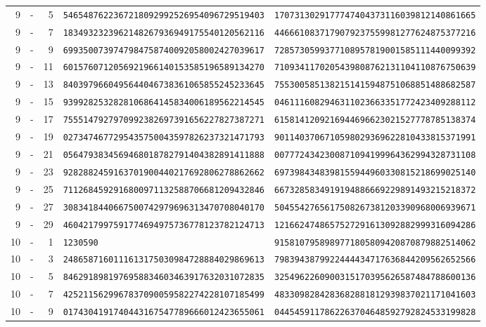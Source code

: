 \begin{longtable}{@{}rcrll@{}}
9&-&5&\texttt{5465487622367218092992526954096729519403}&\texttt{1707313029177747404373116039812140861665}\\
9&-&7&\texttt{1834932323962148267936949175540120562116}&\texttt{4466610837179079237559981277624875377216}\\
9&-&9&\texttt{6993500739747984758740092058002427039617}&\texttt{7285730599377108957819001585111440099392}\\
9&-&11&\texttt{6015760712056921966140153585196589134270}&\texttt{7109341170205439808762131104110876750639}\\
9&-&13&\texttt{8403979660495644046738361065855245233645}&\texttt{7553005851382151415948751068851488682587}\\
9&-&15&\texttt{9399282532828106864145834006189562214545}&\texttt{0461116082946311023663351772423409288112}\\
9&-&17&\texttt{7555147927970992382697391656227827387271}&\texttt{6158141209216944696623021527778785138374}\\
9&-&19&\texttt{0273474677295435750043597826237321471793}&\texttt{9011403706710598029369622810433815371991}\\
9&-&21&\texttt{0564793834569468018782791404382891411888}&\texttt{0077724342300871094199964362994328731108}\\
9&-&23&\texttt{9282882459163701900440217692806278862662}&\texttt{6973984348398155944960330815218699025140}\\
9&-&25&\texttt{7112684592916800971132588706681209432846}&\texttt{6673285834919194886669229891493215218372}\\
9&-&27&\texttt{3083418440667500742979696313470708040170}&\texttt{5045542765617508267381203390968006939671}\\
9&-&29&\texttt{4604217997591774694975736778123782124713}&\texttt{1216624748657527291613092882999316094286}\\
10&-&1&\texttt{1230590}&\texttt{9158107958989771805809420870879882514062}\\
10&-&3&\texttt{2486587160111613175030984728884029869613}&\texttt{7983943879922444434717636844209562652566}\\
10&-&5&\texttt{8462918981976958834603463917632031072835}&\texttt{3254962260900315170395626587484788600136}\\
10&-&7&\texttt{4252115629967837090059582274228107185499}&\texttt{4833098284283682881812939837021171041603}\\
10&-&9&\texttt{0174304191740443167547789666012423655061}&\texttt{0445459117862263704648592792824533199828}\\

\end{longtable}
